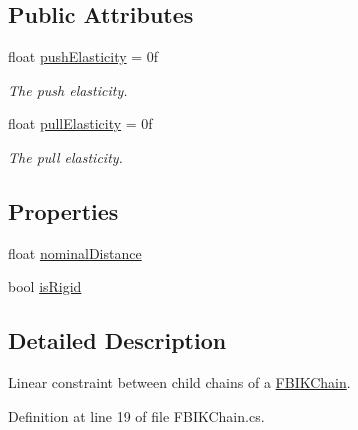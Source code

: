 \subsection*{Public Attributes}
\begin{DoxyCompactItemize}
\item 
float \mbox{\hyperlink{class_root_motion_1_1_final_i_k_1_1_f_b_i_k_chain_1_1_child_constraint_a611b9b5749f46fe9719c20f0dc2bdc91}{push\+Elasticity}} = 0f
\begin{DoxyCompactList}\small\item\em The push elasticity. \end{DoxyCompactList}\item 
float \mbox{\hyperlink{class_root_motion_1_1_final_i_k_1_1_f_b_i_k_chain_1_1_child_constraint_a8953f1b7d25f9f384ec0233016e957cb}{pull\+Elasticity}} = 0f
\begin{DoxyCompactList}\small\item\em The pull elasticity. \end{DoxyCompactList}\end{DoxyCompactItemize}
\subsection*{Properties}
\begin{DoxyCompactItemize}
\item 
float \mbox{\hyperlink{class_root_motion_1_1_final_i_k_1_1_f_b_i_k_chain_1_1_child_constraint_a84a25d0fc611075cace157a15dbe0968}{nominal\+Distance}}
\item 
bool \mbox{\hyperlink{class_root_motion_1_1_final_i_k_1_1_f_b_i_k_chain_1_1_child_constraint_a248ae9052ee50c5f72cb42c25b6067bb}{is\+Rigid}}
\end{DoxyCompactItemize}


\subsection{Detailed Description}
Linear constraint between child chains of a \mbox{\hyperlink{class_root_motion_1_1_final_i_k_1_1_f_b_i_k_chain}{F\+B\+I\+K\+Chain}}. 



Definition at line 19 of file F\+B\+I\+K\+Chain.\+cs.



